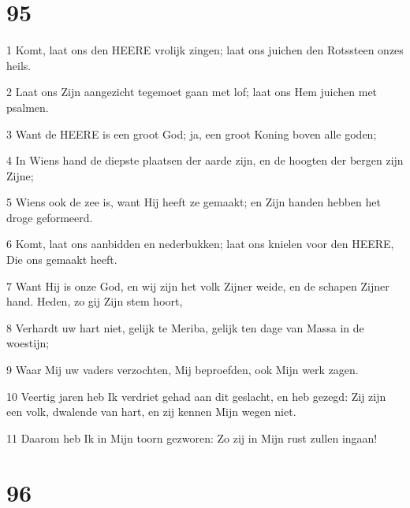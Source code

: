 \chapter{95}

\par 1 Komt, laat ons den HEERE vrolijk zingen; laat ons juichen den Rotssteen onzes heils.
\par 2 Laat ons Zijn aangezicht tegemoet gaan met lof; laat ons Hem juichen met psalmen.
\par 3 Want de HEERE is een groot God; ja, een groot Koning boven alle goden;
\par 4 In Wiens hand de diepste plaatsen der aarde zijn, en de hoogten der bergen zijn Zijne;
\par 5 Wiens ook de zee is, want Hij heeft ze gemaakt; en Zijn handen hebben het droge geformeerd.
\par 6 Komt, laat ons aanbidden en nederbukken; laat ons knielen voor den HEERE, Die ons gemaakt heeft.
\par 7 Want Hij is onze God, en wij zijn het volk Zijner weide, en de schapen Zijner hand. Heden, zo gij Zijn stem hoort,
\par 8 Verhardt uw hart niet, gelijk te Meriba, gelijk ten dage van Massa in de woestijn;
\par 9 Waar Mij uw vaders verzochten, Mij beproefden, ook Mijn werk zagen.
\par 10 Veertig jaren heb Ik verdriet gehad aan dit geslacht, en heb gezegd: Zij zijn een volk, dwalende van hart, en zij kennen Mijn wegen niet.
\par 11 Daarom heb Ik in Mijn toorn gezworen: Zo zij in Mijn rust zullen ingaan!

\chapter{96}


